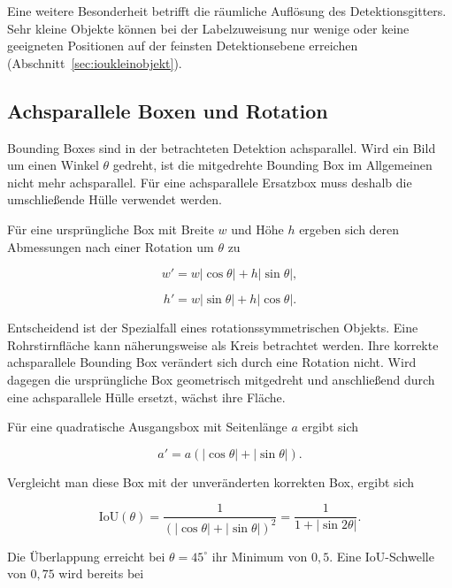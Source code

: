 Eine weitere Besonderheit betrifft die räumliche Auflösung des Detektionsgitters. Sehr kleine Objekte können bei der Labelzuweisung nur wenige oder keine geeigneten Positionen auf der feinsten Detektionsebene erreichen (Abschnitt~\ref{sec:ioukleinobjekt}).

\subsection{Achsparallele Boxen und Rotation}
\label{sec:boxrotation}

Bounding Boxes sind in der betrachteten Detektion achsparallel. Wird ein Bild um einen Winkel $\theta$ gedreht, ist die mitgedrehte Bounding Box im Allgemeinen nicht mehr achsparallel. Für eine achsparallele Ersatzbox muss deshalb die umschließende Hülle verwendet werden.

Für eine ursprüngliche Box mit Breite $w$ und Höhe $h$ ergeben sich deren Abmessungen nach einer Rotation um $\theta$ zu

\begin{equation}
w'
=
w|\cos\theta|
+
h|\sin\theta|,
\end{equation}

\begin{equation}
h'
=
w|\sin\theta|
+
h|\cos\theta|.
\end{equation}

Entscheidend ist der Spezialfall eines rotationssymmetrischen Objekts. Eine Rohrstirnfläche kann näherungsweise als Kreis betrachtet werden. Ihre korrekte achsparallele Bounding Box verändert sich durch eine Rotation nicht. Wird dagegen die ursprüngliche Box geometrisch mitgedreht und anschließend durch eine achsparallele Hülle ersetzt, wächst ihre Fläche.

Für eine quadratische Ausgangsbox mit Seitenlänge $a$ ergibt sich

\begin{equation}
a'
=
a
\left(
|\cos\theta|+|\sin\theta|
\right).
\end{equation}

Vergleicht man diese Box mit der unveränderten korrekten Box, ergibt sich

\begin{equation}
\mathrm{IoU}(\theta)
=
\frac{1}
{\left(
|\cos\theta|+|\sin\theta|
\right)^2}
=
\frac{1}
{1+|\sin 2\theta|}.
\label{eq:ioutheta}
\end{equation}

Die Überlappung erreicht bei $\theta=45^\circ$ ihr Minimum von $0{,}5$. Eine IoU-Schwelle von $0{,}75$ wird bereits bei

